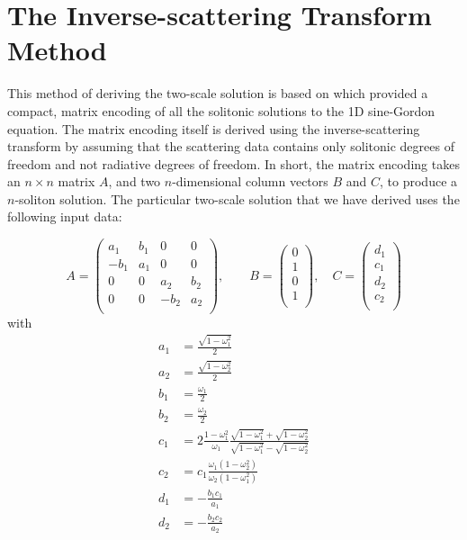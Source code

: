 \documentclass{report}
\begin{document}
\section{The Inverse-scattering Transform Method}
This method of deriving the two-scale solution is based on \cite{:/content/aip/journal/jmp/51/12/10.1063/1.3520596} which provided a compact, matrix encoding of all the solitonic solutions to the 1D sine-Gordon equation. The matrix encoding itself is derived using the inverse-scattering transform by assuming that the scattering data contains only solitonic degrees of freedom and not radiative degrees of freedom. In short, the matrix encoding takes an $n\times n$ matrix $A$, and two $n$-dimensional column vectors $B$ and $C$, to produce a $n$-soliton solution. The particular two-scale solution that we have derived uses the following input data:

\begin{equation}
A=\left(
\begin{array}{cccc}
 a_1 & b_1 & 0 & 0 \\
 -b_1 & a_1 & 0 & 0 \\
 0 & 0 & a_2 & b_2 \\
 0 & 0 & -b_2 & a_2 \\
\end{array}
\right),
\qquad B=\left(\begin{array}{c}
 0 \\
 1 \\
 0 \\
 1 \\
\end{array}\right),
\quad C=\left(\begin{array}{c}
 d_1 \\
 c_1 \\
 d_2 \\
 c_2 \\
\end{array}\right)
\end{equation}
with
\begin{subequations}
  \begin{align}
    a_1 &=\frac{\sqrt{1-\omega_1^2}}{2}\\
    a_2 &=\frac{\sqrt{1-\omega_2^2}}{2}\\
    b_1 &=\frac{\omega_1}{2}\\
    b_2 &=\frac{\omega_2}{2}\\
    c_1 &= 2\frac{1-\omega_1^2}{\omega_1}
    \frac{\sqrt{1-\omega_1^2}+\sqrt{1-\omega_2^2}}{\sqrt{1-\omega_1^2}-\sqrt{1-\omega_2^2}}\\
    c_2 &= c_1 \frac{\omega_1(1-\omega_2^2)}{\omega_2(1-\omega_1^2)}\\
    d_1 &=-\frac{b_1 c_1}{a_1}\\
    d_2 &=-\frac{b_2 c_2}{a_2}
  \end{align}
\end{subequations}
\end{document}
